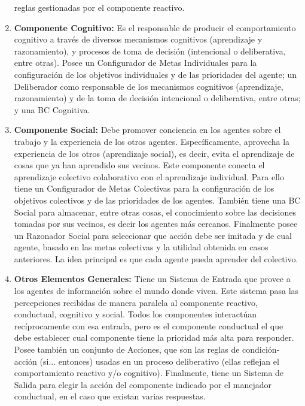 \begin{enumerate}
reglas gestionadas por el componente reactivo.
\item \textbf{Componente Cognitivo:} Es el responsable de producir el comportamiento
cognitivo a través de diversos mecanismos cognitivos (aprendizaje y
razonamiento), y procesos de toma de decisión (intencional o deliberativa, entre
otras). Posee un Configurador de Metas Individuales para la configuración de los
objetivos individuales y de las prioridades del agente; un Deliberador como
responsable de los mecanismos cognitivos (aprendizaje, razonamiento) y de la
toma de decisión intencional o deliberativa, entre otras; y una BC Cognitiva.
\item \textbf{Componente Social:} Debe promover conciencia en los agentes sobre el
trabajo y la experiencia de los otros agentes. Específicamente, aprovecha la
experiencia de los otros (aprendizaje social), es decir, evita el aprendizaje de
cosas que ya han aprendido sus vecinos. Este componente conecta el aprendizaje
colectivo colaborativo con el aprendizaje individual. Para ello tiene un
Configurador de Metas Colectivas para la configuración de los objetivos
colectivos y de las prioridades de los agentes. También tiene una BC Social para
almacenar, entre otras cosas, el conocimiento sobre las decisiones tomadas por
sus vecinos, es decir los agentes más cercanos. Finalmente posee un Razonador
Social para seleccionar que acción debe ser imitada y de cual agente, basado en
las metas colectivas y la utilidad obtenida en casos anteriores. La idea
principal es que cada agente pueda aprender del colectivo.
\item \textbf{Otros Elementos Generales:} Tiene un Sistema de Entrada que provee a los
agentes de información sobre el mundo donde viven. Este sistema pasa las
percepciones recibidas de manera paralela al componente reactivo, conductual,
cognitivo y social. Todos los componentes interactúan recíprocamente con esa
entrada, pero es el componente conductual el que debe establecer cual componente
tiene la prioridad más alta para responder. Posee también un conjunto de
Acciones, que son las reglas de condición-acción (si... entonces) usadas en un
proceso deliberativo (ellas reflejan el comportamiento reactivo y/o cognitivo).
Finalmente, tiene un Sistema de Salida para elegir la acción del componente
indicado por el manejador conductual, en el caso que existan varias respuestas.
\end{enumerate}


